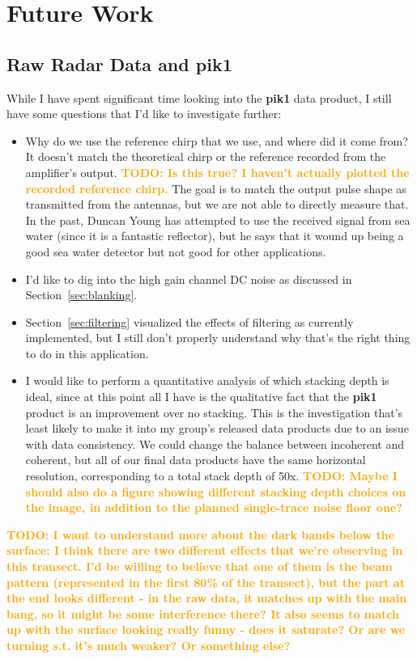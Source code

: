 \documentclass[11pt]{article}
\newcommand{\future}[1]{\ifthenelse{\boolean{include-future}} {\textcolor{Orange}{\textbf{TODO: #1}}}{}}
\newcommand{\secref}[1]{Section~\ref{#1}}
\begin{document}
\section{Future Work}

\subsection{Raw Radar Data and \textbf{pik1}}

While I have spent significant time looking into the \textbf{pik1} data product, I still have some questions that I'd like to investigate further:
\begin{itemize}
\item Why do we use the reference chirp that we use, and where did it come from? It doesn't match the theoretical chirp or the reference recorded from the amplifier's output. \future{Is this true? I haven't actually plotted the recorded reference chirp.} The goal is to match the output pulse shape as transmitted from the antennas, but we are not able to directly measure that. In the past, Duncan Young has attempted to use the received signal from sea water (since it is a fantastic reflector), but he says that it wound up being a good sea water detector but not good for other applications.
\item I'd like to dig into the high gain channel DC noise as discussed in \secref{sec:blanking}.
\item \secref{sec:filtering} visualized the effects of filtering as currently implemented, but I still don't properly understand why that's the right thing to do in this application.
\item I would like to perform a quantitative analysis of which stacking depth is ideal, since at this point all I have is the qualitative fact that the \textbf{pik1} product is an improvement over no stacking. This is the investigation that's least likely to make it into my group's released data products due to an issue with data consistency. We could change the balance between incoherent and coherent, but all of our final data products have the same horizontal resolution, corresponding to a total stack depth of 50x. \future{Maybe I should also do a figure showing different stacking depth choices on the image, in addition to the planned single-trace noise floor one?}
\end{itemize}

\future{I want to understand more about the dark bands below the surface: I think there are two different effects that we're observing in this transect. I'd be willing to believe that one of them is the beam pattern (represented in the first 80\% of the transect), but the part at the end looks different - in the raw data, it matches up with the main bang, so it might be some interference there? It also seems to match up with the surface looking really funny - does it saturate? Or are we turning s.t. it's much weaker? Or something else?}
\end{document}
